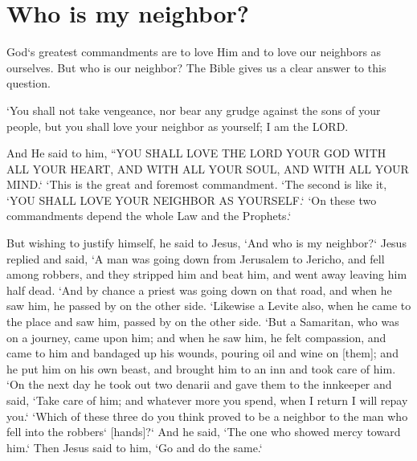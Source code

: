 \chapter{Who is my neighbor?}

God`s greatest commandments are to love Him and to love our neighbors as ourselves. But who is our neighbor? The Bible gives us a clear answer to this question.

\begin{scripture}[Leviticus 19:18]
    `You shall not take vengeance, nor bear any grudge against the sons of your people, but you shall love your neighbor as yourself; I am the LORD.
\end{scripture}

\vspace{2\baselineskip}

\begin{scripture}[Matthew 22:37-40]
    And He said to him, ``YOU SHALL LOVE THE LORD YOUR GOD WITH ALL YOUR HEART, AND WITH ALL YOUR SOUL, AND WITH ALL YOUR MIND.`
    `This is the great and foremost commandment.
    `The second is like it, `YOU SHALL LOVE YOUR NEIGHBOR AS YOURSELF.`
    `On these two commandments depend the whole Law and the Prophets.`
\end{scripture}

\vspace{2\baselineskip}

\begin{scripture}[Luke 10:29-37]
    But wishing to justify himself, he said to Jesus, `And who is my neighbor?`
    Jesus replied and said, `A man was going down from Jerusalem to Jericho, and fell among robbers, and they stripped him and beat him, and went away leaving him half dead.
    `And by chance a priest was going down on that road, and when he saw him, he passed by on the other side.
    `Likewise a Levite also, when he came to the place and saw him, passed by on the other side.
    `But a Samaritan, who was on a journey, came upon him; and when he saw him, he felt compassion,
    and came to him and bandaged up his wounds, pouring oil and wine on [them]; and he put him on his own beast, and brought him to an inn and took care of him.
    `On the next day he took out two denarii and gave them to the innkeeper and said, `Take care of him; and whatever more you spend, when I return I will repay you.`
    `Which of these three do you think proved to be a neighbor to the man who fell into the robbers` [hands]?`
    And he said, `The one who showed mercy toward him.` Then Jesus said to him, `Go and do the same.`
\end{scripture}

